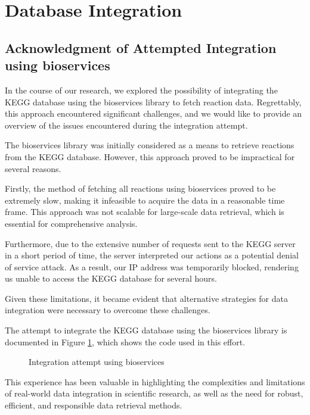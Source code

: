 \section{Database Integration}

\subsection{Acknowledgment of Attempted Integration using bioservices}

In the course of our research, we explored the possibility of integrating the KEGG database using the bioservices library to fetch reaction data. 
Regrettably, this approach encountered significant challenges, and we would like to provide an overview of the issues encountered during the integration attempt.

The bioservices library was initially considered as a means to retrieve reactions from the KEGG database. However, this approach proved to be impractical for several reasons. 

Firstly, the method of fetching all reactions using bioservices proved to be extremely slow, making it infeasible to acquire the data in a reasonable time frame. This approach was not scalable for large-scale data retrieval, which is essential for comprehensive analysis.

Furthermore, due to the extensive number of requests sent to the KEGG server in a short period of time, the server interpreted our actions as a potential denial of service attack. As a result, our IP address was temporarily blocked, rendering us unable to access the KEGG database for several hours. 

Given these limitations, it became evident that alternative strategies for data integration were necessary to overcome these challenges. 

The attempt to integrate the KEGG database using the bioservices library is documented in Figure \ref{fig:bioservices}, which shows the code used in this effort.

\begin{figure}[H]
    \centering
    
    \caption{Integration attempt using bioservices}
    \label{fig:bioservices}
\end{figure}

This experience has been valuable in highlighting the complexities and limitations of real-world data integration in scientific research, as well as the need for robust, efficient, and responsible data retrieval methods.


